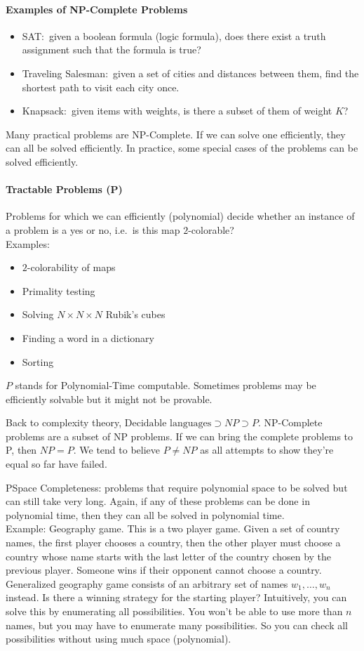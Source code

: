 \documentclass[12 pt]{article}
\begin{document}
\paragraph{Examples of NP-Complete Problems}
\begin{itemize}
\item SAT:\ given a boolean formula (logic formula), does there exist
  a truth assignment such that the formula is true?
\item Traveling Salesman:\ given a set of cities and distances between
  them, find the shortest path to visit each city once.
\item Knapsack:\ given items with weights, is there a subset of them
  of weight $K$?
\end{itemize}
Many practical problems are NP-Complete. If we can solve one
efficiently, they can all be solved efficiently. In practice, some
special cases of the problems can be solved efficiently.
\paragraph{Tractable Problems (P)} Problems for which we can
efficiently (polynomial) decide whether an instance of a problem is a
yes or no, i.e.\ is this map $2$-colorable?
\\ Examples:
\begin{itemize}
\item $2$-colorability of maps
\item Primality testing
\item Solving $N \times N \times N$ Rubik's cubes
\item Finding a word in a dictionary
\item Sorting
\end{itemize}
$P$ stands for Polynomial-Time computable. Sometimes problems may be
efficiently solvable but it might not be provable.

Back to complexity theory, $\text{Decidable languages} \supset NP
\supset P$. NP-Complete problems are a subset of NP problems. If we
can bring the complete problems to P, then $NP = P$. We tend to
believe $P \neq NP$ as all attempts to show they're equal so far have
failed.

PSpace Completeness: problems that require polynomial space to be solved but can
still take very long. Again, if any of these problems can be done in
polynomial time, then they can all be solved in polynomial time.
\\ Example: Geography game. This is a two player game. Given a set of
country names, the first player chooses a country, then the other
player must choose a country whose name starts with the last letter of
the country chosen by the previous player. Someone wins if their
opponent cannot choose a country.
\\ Generalized geography game consists of an arbitrary set of names
$w_1, \ldots, w_n$ instead. Is there a winning strategy for the
starting player? Intuitively, you can solve this by enumerating all
possibilities. You won't be able to use more than $n$ names, but you
may have to enumerate many possibilities. So you can check all
possibilities without using much space (polynomial).
\end{document}
